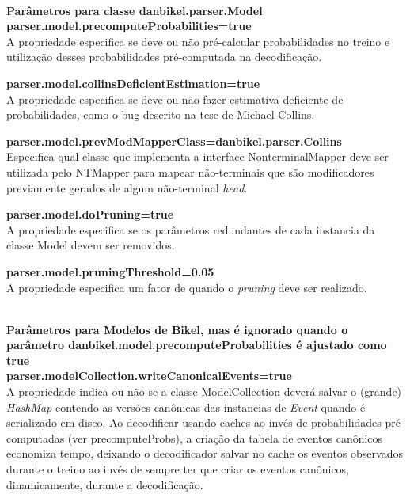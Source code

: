 \HRule \\

\textbf{Parâmetros para classe danbikel.parser.Model}\\

\textbf{parser.model.precomputeProbabilities=true}\\
A propriedade especifica se deve ou não pré-calcular probabilidades no treino e utilização desses probabilidades pré-computada na decodificação.

\textbf{parser.model.collinsDeficientEstimation=true}\\
A propriedade especifica se deve ou não fazer estimativa deficiente de probabilidades, como o bug descrito na tese de Michael Collins.

\textbf{parser.model.prevModMapperClass=danbikel.parser.Collins}\\
Especifica qual classe que implementa a interface NonterminalMapper deve ser utilizada pelo NTMapper para mapear não-terminais que são modificadores previamente gerados de algum não-terminal \emph{head}.

\textbf{parser.model.doPruning=true}\\
A propriedade especifica se os parâmetros redundantes de cada instancia da classe Model devem ser removidos.

\textbf{parser.model.pruningThreshold=0.05}\\
A propriedade especifica um fator de quando o \emph{pruning} deve ser realizado.

\HRule \\

\textbf{Parâmetros para Modelos de Bikel, mas é ignorado quando o parâmetro danbikel.model.precomputeProbabilities é ajustado como true}\\

\textbf{parser.modelCollection.writeCanonicalEvents=true}\\
A propriedade indica ou não se a classe ModelCollection deverá salvar o (grande) \emph{HashMap} contendo as versões canônicas das instancias de \emph{Event} quando é serializado em disco. Ao decodificar usando caches ao invés de probabilidades pré-computadas (ver precomputeProbs), a criação da tabela de eventos canônicos economiza tempo, deixando o decodificador salvar no cache os eventos observados durante o treino ao invés de sempre ter que criar os eventos canônicos, dinamicamente, durante a decodificação.

\HRule \\

